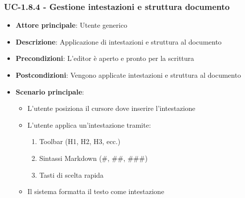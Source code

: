 \documentclass[11pt,a4paper]{article}
\begin{document}
\subsubsection{UC-1.8.4 - Gestione intestazioni e struttura documento}
\begin{itemize}
    \item \textbf{Attore principale}: Utente generico
    \item \textbf{Descrizione}: Applicazione di intestazioni e struttura al documento
    \item \textbf{Precondizioni}: L'editor è aperto e pronto per la scrittura
    \item \textbf{Postcondizioni}: Vengono applicate intestazioni e struttura al documento
    \item \textbf{Scenario principale}:
        \begin{itemize}
            \item L'utente posiziona il cursore dove inserire l'intestazione
            \item L'utente applica un'intestazione tramite:
                \begin{enumerate}
                    \item Toolbar (H1, H2, H3, ecc.)
                    \item Sintassi Markdown (\#, \#\#, \#\#\#)
                    \item Tasti di scelta rapida
                \end{enumerate}
            \item Il sistema formatta il testo come intestazione
        \end{itemize}
\end{itemize}
\end{document}
